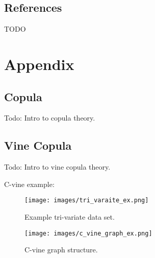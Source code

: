 \documentclass[10pt,a4paper]{report}
\begin{document}
\section*{References}

TODO

\chapter{Appendix}

\section{Copula}
Todo: Intro to copula theory.

\section{Vine Copula}
Todo: Intro to vine copula theory.

C-vine example:

\begin{figure}[hbtp]
\centering
\texttt{[image: images/tri\_varaite\_ex.png]}
\caption{Example tri-variate data set.}
\label{tri_var}
\end{figure}

\begin{figure}[hbtp]
\centering
\texttt{[image: images/c\_vine\_graph\_ex.png]}
\caption{C-vine graph structure.}
\label{c_vine}
\end{figure}
\end{document}
